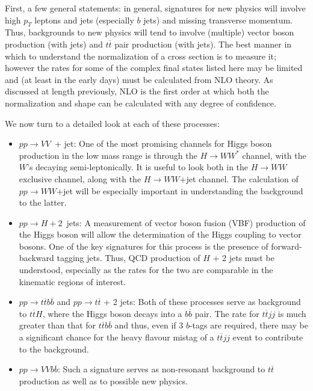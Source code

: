 \documentclass[12pt]{iopart}
\begin{document}
First, a few general statements: in general, signatures for new physics will involve high $p_T$ leptons and jets (especially
$b$ jets) and missing transverse momentum. Thus, backgrounds to new physics will tend to involve (multiple) vector boson
production (with jets) and $t\overline{t}$ pair production (with jets). The best manner in which to understand the
normalization of a cross section is to measure it; however the rates for some of the complex final states listed here may be
limited and (at least in the early days) must be calculated from NLO theory. As discussed at length previously, NLO is the first
order at which both the normalization and shape can be calculated with any degree of confidence.

We now turn to a detailed look at each of these processes:
\begin{itemize}
\item $pp \rightarrow VV$~+ jet: One of the most promising channels for Higgs boson
production in the low mass range is through the $H\rightarrow  WW^*$ channel, with
the $W$'s decaying semi-leptonically. It is useful to look both in the
$H\rightarrow  WW$ exclusive channel, along with the $H\rightarrow  WW$+jet
channel. The calculation of $pp\rightarrow  WW$+jet will be especially important in
understanding the background to the latter.

\item $pp \rightarrow  H+2$~jets: A measurement of vector boson fusion (VBF) 
production of the Higgs boson will
allow the determination of the Higgs coupling to vector bosons. One of the key
signatures for this process is the presence of forward-backward tagging jets.
Thus, QCD production of $H$ + 2 jets must be understood, especially as the rates for
the two are comparable in the kinematic regions of interest.

\item $pp \rightarrow  t\overline{t} b\overline{b}$ and $pp
\rightarrow t\overline{t}$ + 2 jets: Both of these processes serve as background to
$t\overline{t}H$, where the Higgs boson decays into a $b\overline{b}$ pair. The rate for
$t\overline{t}jj$ is much greater than that for $t\overline{t}b\overline{b}$ and
thus, even if 3 $b$-tags are required, there may be a significant chance for the
heavy flavour mistag of a $t\overline{t}jj$ event to contribute to the background.

\item $pp \rightarrow  VV b\overline{b}$: Such a signature serves as non-resonant
background to $t\overline{t}$ production as well as to possible new physics.


\end{itemize}
\end{document}
